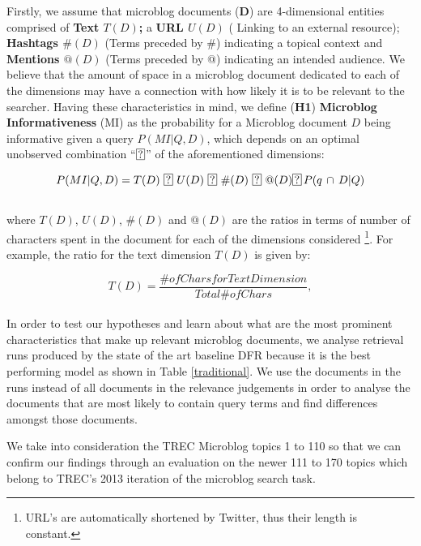 Firstly, we assume that microblog documents (\textbf{D}) are 4-dimensional entities comprised of \textbf{Text \(T(D)\);} a \textbf{URL \(U(D)\)} ( Linking to an external resource); \textbf{Hashtags \(\#(D)\)} (Terms preceded by \#) indicating a topical context and \textbf{Mentions \(@(D)\)} (Terms preceded by @) indicating an intended audience. We believe that the amount of space in a microblog document dedicated to each of the dimensions may have a connection with how likely it is to be relevant to the searcher. Having these characteristics in mind, we define (\textbf{H1}) \textbf{Microblog Informativeness} (MI) as the probability for a Microblog document \(D\) being informative given a query \(P(MI|Q,D)\), which depends on an optimal unobserved combination ``\(\circled{?}\)'' of the aforementioned dimensions:

\begin{equation}
 P(MI|Q,D) =  T(D)~ \circled{?}~  U(D)~  \circled{?}~  \#(D)~  \circled{?}~  @(D) \circled{?}\, P(q\, \cap\, D | Q) %
\end{equation} \\

\noindent where \(T(D)\), \(U(D)\), \(\#(D)\) and \(@(D)\) are the ratios in terms of number of characters spent in the document for each of the dimensions considered \footnote{URL's are automatically shortened by Twitter, thus their length is constant.}. For example, the ratio for the text dimension  \(T(D)\) is given by:

\begin{equation}
	T(D)= \frac{\# of Chars for Text Dimension}{ Total \# of Chars},
\end{equation}\\

In order to test our hypotheses and learn about what are the most prominent characteristics that make up relevant microblog documents, we analyse retrieval runs produced by the state of the art baseline DFR because it is the best performing model as shown in Table \ref{traditional}. We use the documents in the runs instead of all documents in the relevance judgements in order to analyse the documents that are most likely to contain query terms and find differences amongst those documents.

We take into consideration the TREC Microblog topics 1 to 110 so that we can confirm our findings through an evaluation on the newer 111 to 170 topics which belong to TREC's 2013 iteration of the microblog search task.


